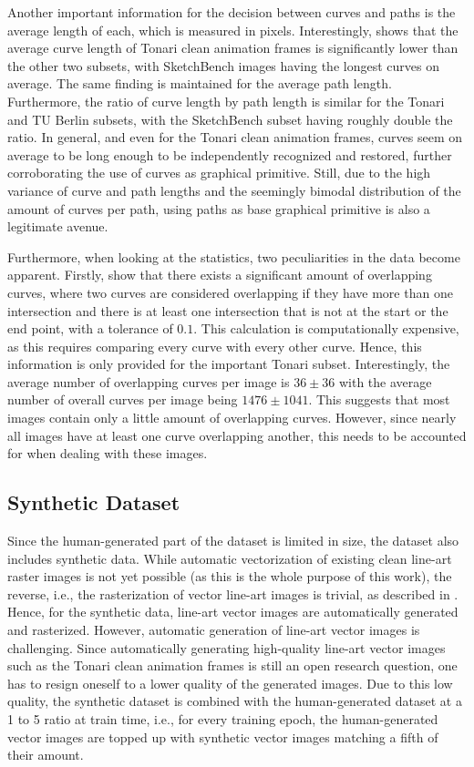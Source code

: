 Another important information for the decision between curves and paths is the average length of each, which is measured in pixels. Interestingly,  shows that the average curve length of Tonari clean animation frames is significantly lower than the other two subsets, with SketchBench images having the longest curves on average. The same finding is maintained for the average path length. Furthermore, the ratio of curve length by path length is similar for the Tonari and TU Berlin subsets, with the SketchBench subset having roughly double the ratio. In general, and even for the Tonari clean animation frames, curves seem on average to be long enough to be independently recognized and restored, further corroborating the use of curves as graphical primitive. Still, due to the high variance of curve and path lengths and the seemingly bimodal distribution of the amount of curves per path, using paths as base graphical primitive is also a legitimate avenue.

Furthermore, when looking at the statistics, two peculiarities in the data become apparent. Firstly,  show that there exists a significant amount of overlapping curves, where two curves are considered overlapping if they have more than one intersection and there is at least one intersection that is not at the start or the end point, with a tolerance of $0.1$. This calculation is computationally expensive, as this requires comparing every curve with every other curve. Hence, this information is only provided for the important Tonari subset. Interestingly, the average number of overlapping curves per image is $36\pm36$ with the average number of overall curves per image being $1476\pm1041$. This suggests that most images contain only a little amount of overlapping curves. However, since nearly all images have at least one curve overlapping another, this needs to be accounted for when dealing with these images.

\subsection{Synthetic Dataset}
\label{subsec:dataset.synthetic}
Since the human-generated part of the dataset is limited in size, the dataset also includes synthetic data. While automatic vectorization of existing clean line-art raster images is not yet possible (as this is the whole purpose of this work), the reverse, i.e., the rasterization of vector line-art images is trivial, as described in . Hence, for the synthetic data, line-art vector images are automatically generated and rasterized. However, automatic generation of line-art vector images is challenging. Since automatically generating high-quality line-art vector images such as the Tonari clean animation frames is still an open research question, one has to resign oneself to a lower quality of the generated images. Due to this low quality, the synthetic dataset is combined with the human-generated dataset at a 1 to 5 ratio at train time, i.e., for every training epoch, the human-generated vector images are topped up with synthetic vector images matching a fifth of their amount.

